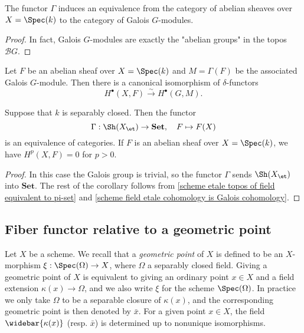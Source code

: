 \begin{corollary}\label{scheme etale abelian sheaf of field equivalence to Galois module}
The functor $\Gamma$ induces an equivalence from the category of abelian sheaves over $X=\Spec(k)$ to the category of Galois $G$-modules.
\end{corollary}
\begin{proof}
In fact, Galois $G$-modules are exactly the "abelian groups" in the topos $\mathcal{B}G$.
\end{proof}

\begin{corollary}\label{scheme field etale cohomology is Galois cohomology}
Let $F$ be an abelian sheaf over $X=\Spec(k)$ and $M=\Gamma(F)$ be the associated Galois $G$-module. Then there is a canonical isomorphism of $\delta$-functors
\[H^\bullet(X,F) \stackrel{\sim}{\to} H^\bullet(G,M).\]
\end{corollary}

\begin{corollary}\label{scheme separably closed field etale topos is set}
Suppose that $k$ is separably closed. Then the functor
\[\Gamma:\Sh(X_\et)\to\mathbf{Set},\quad F\mapsto F(X)\]
is an equivalence of categories. If $F$ is an abelian sheaf over $X=\Spec(k)$, we have $H^p(X,F)=0$ for $p>0$.  
\end{corollary}
\begin{proof}
In this case the Galois group is trivial, so the functor $\Gamma$ sends $\Sh(X_\et)$ into $\mathbf{Set}$. The rest of the corollary follows from \cref{scheme etale topos of field equivalent to pi-set} and \cref{scheme field etale cohomology is Galois cohomology}.
\end{proof}

\subsection{Fiber functor relative to a geometric point}
Let $X$ be a scheme. We recall that a \textit{geometric point} of $X$ is defined to be an $X$-morphism $\xi:\Spec(\Omega)\to X$, where $\Omega$ a separably closed field. Giving a geometric point of $X$ is equivalent to giving an ordinary point $x\in X$ and a field extension $\kappa(x)\to\Omega$, and we also write $\xi$ for the scheme $\Spec(\Omega)$. In practice we only take $\Omega$ to be a separable closure of $\kappa(x)$, and the corresponding geometric point is then denoted by $\bar{x}$. For a given point $x\in X$, the field $\widebar{\kappa(x)}$ (resp. $\bar{x}$) is determined up to nonunique isomorphisms.

